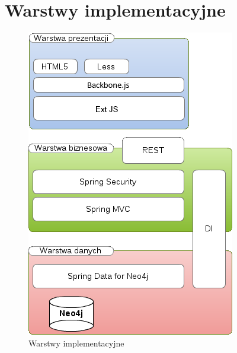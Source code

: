 \section{Warstwy implementacyjne}
\begin{figure}[H]
	\centering
	\includegraphics[scale=0.9]{images/warstwy.png}
	\caption{Warstwy implementacyjne}
\end{figure}
\newpage

